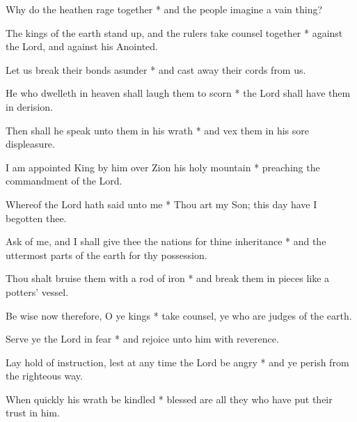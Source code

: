 Why do the heathen rage together * and the people imagine a vain thing?

The kings of the earth stand up, and the rulers take counsel together * against the Lord, and against his Anointed.

Let us break their bonds asunder * and cast away their cords from us.

He who dwelleth in heaven shall laugh them to scorn * the Lord shall have them in derision.

Then shall he speak unto them in his wrath * and vex them in his sore displeasure.

I am appointed King by him over Zion his holy mountain * preaching the commandment of the Lord.

Whereof the Lord hath said unto me * Thou art my Son; this day have I begotten thee.

Ask of me, and I shall give thee the nations for thine inheritance * and the uttermost parts of the earth for thy possession.

Thou shalt bruise them with a rod of iron * and break them in pieces like a potters' vessel.

Be wise now therefore, O ye kings * take counsel, ye who are judges of the earth.

Serve ye the Lord in fear * and rejoice unto him with reverence.

Lay hold of instruction, lest at any time the Lord be angry * and ye perish from the righteous way.

When quickly his wrath be kindled * blessed are all they who have put their trust in him.